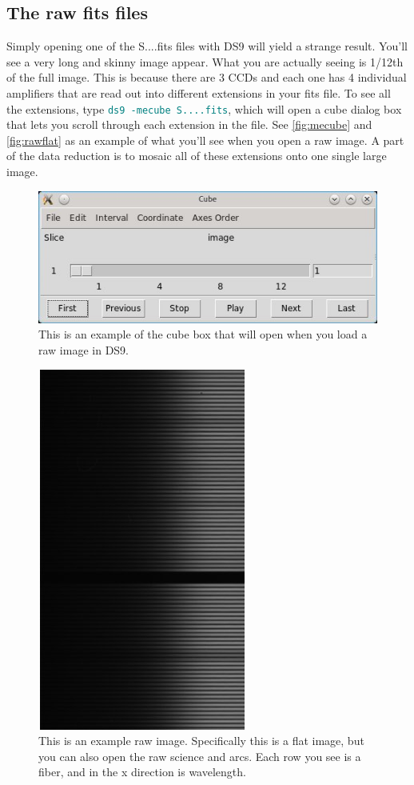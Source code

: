 \documentclass[12pt]{report}
\newcommand{\ty}[1]{\textcolor{teal}{\texttt{#1}}}
\begin{document}
\subsection{The raw fits files}

Simply opening one of the S....fits files with DS9 will yield a strange result. You'll see a very long and skinny image appear. What you are actually seeing is 1/12th of the full image. This is because there are 3 CCDs and each one has 4 individual amplifiers that are read out into different extensions in your fits file. To see all the extensions, type \ty{ds9 -mecube S....fits}, which will open a cube dialog box that lets you scroll through each extension in the file. See \autoref{fig:mecube} and \autoref{fig:rawflat} as an example of what you'll see when you open a raw image. A part of the data reduction is to mosaic all of these extensions onto one single large image.

\begin{figure}[h]
\centering
\includegraphics{mecube_raw.jpeg}
\caption[Example of DS9 cube diaglog box]{This is an example of the cube box that will open when you load a raw image in DS9.}
\label{fig:mecube}
\end{figure}

\begin{figure}[h]
\centering
\includegraphics{raw_flat.jpeg}
\caption[Example of DS9 cube diaglog box]{This is an example raw image. Specifically this is a flat image, but you can also open the raw science and arcs. Each row you see is a fiber, and in the x direction is wavelength.}
\label{fig:rawflat}
\end{figure}
\end{document}
